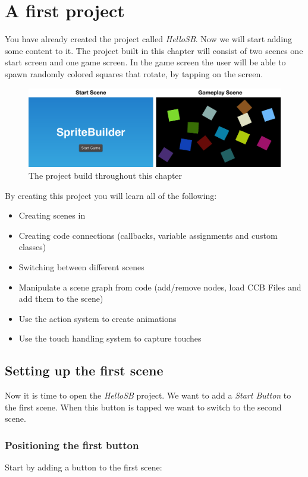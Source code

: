 \section{A first \SB{} project} 
You have already created the \SB{} project called \textit{HelloSB}. Now we will
start adding some content to it. The project built in this chapter will consist
of two scenes one start screen and one game screen. In the game screen the user will be able to spawn randomly
colored squares that rotate, by tapping on the screen.
\begin{figure}[H]
		\centering
		\includegraphics[width=0.9\linewidth]{images/firstproject/first_project.png}
		\caption{The project build throughout this chapter}
\end{figure}
By creating this project you will learn all of the following:
\begin{itemize}
  \item Creating scenes in \SB{}
  \item Creating code connections (callbacks, variable assignments and custom
  classes)
  \item Switching between different scenes
  \item Manipulate a scene graph from code (add/remove nodes, load CCB Files and
  add them to the scene)
  \item Use the \cocos{} action system to create animations
  \item Use the \cocos{} touch handling system to capture touches
\end{itemize}

\subsection{Setting up the first scene}
Now it is time to open the \textit{HelloSB} \SB{} project. We want to add a
\textit{Start Button} to the first scene. When this button is tapped we want to
switch to the second scene. 

\subsubsection{Positioning the first button}
Start by adding a button to the first scene:

